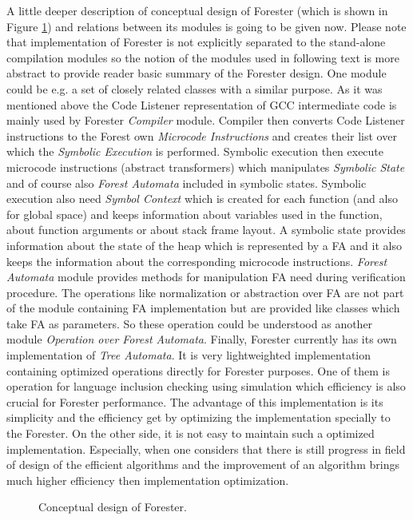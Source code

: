 A little deeper description of conceptual design of Forester (which is shown in Figure \ref{fig:fa_design}) and relations
between its modules is going to be given now.
Please note that implementation of Forester is not explicitly separated to the stand-alone compilation modules so the notion of the modules
used in following text is more abstract to provide reader basic summary of the Forester design.
One module could be e.g. a set of closely related classes with a similar purpose.
As it was mentioned above the Code Listener representation of GCC intermediate code is mainly used by Forester \emph{Compiler} module.
Compiler then converts Code Listener instructions to the Forest own \emph{Microcode Instructions} and creates their list over which the \emph{Symbolic Execution} is performed.
Symbolic execution then execute microcode instructions (abstract transformers) which manipulates \emph{Symbolic State} and of course
also \emph{Forest Automata} included in symbolic states.
Symbolic execution also need \emph{Symbol Context} which is created for each function (and also for global space)
and keeps information about variables used in the function, about function arguments or about stack frame layout.
A symbolic state provides information about the state of the heap which is represented by a FA and it also keeps the information about
the corresponding microcode instructions.
\emph{Forest Automata} module provides methods for manipulation FA need during verification procedure.
The operations like normalization or abstraction over FA are not part of the module containing FA implementation but are provided
like classes which take FA as parameters.
So these operation could be understood as another module \emph{Operation over Forest Automata}.
Finally, Forester currently has its own implementation of \emph{Tree Automata}.
It is very lightweighted implementation containing optimized operations directly for Forester purposes.
One of them is operation for language inclusion checking using simulation which efficiency is also crucial for Forester performance.
The advantage of this implementation is its simplicity and
the efficiency get by optimizing the implementation specially to the Forester.
On the other side, it is not easy to maintain such a optimized implementation.
Especially, when one considers that there is still progress in field of design of the efficient algorithms
and the improvement of an algorithm brings much higher efficiency then implementation optimization.

\begin{figure}[bt]
	\begin{center}
		
	\end{center}
	\caption{Conceptual design of Forester.}
	\label{fig:fa_design}
\end{figure}

